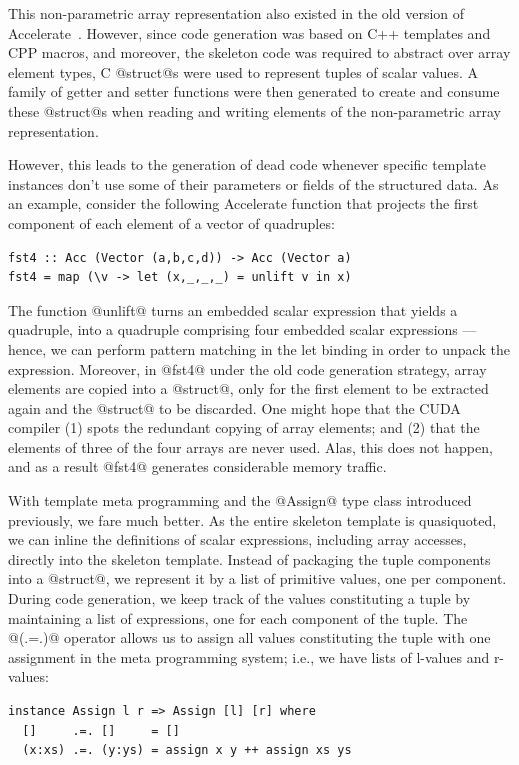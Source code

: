 This non-parametric array representation 
also existed in the old version of Accelerate~\cite{Chakravarty:2011fr}.
However, since code generation was based on C++ templates and CPP macros, and
moreover, the skeleton code was required to abstract over array element types, C
@struct@s were used to represent tuples of scalar values. A family of getter and
setter functions were then generated to create and consume these @struct@s when
reading and writing elements of the non-parametric array representation.

However, this leads to the generation of dead code whenever specific template
instances don't use some of their parameters or fields of the structured data.
As an example, consider the following Accelerate function that projects the
first component of each element of a vector of quadruples:
%
\begin{lstlisting}[style=haskell]
fst4 :: Acc (Vector (a,b,c,d)) -> Acc (Vector a)
fst4 = map (\v -> let (x,_,_,_) = unlift v in x)
\end{lstlisting}
%
The function @unlift@ turns an embedded scalar expression that yields a
quadruple, into a quadruple comprising four embedded scalar expressions ---
hence, we can perform pattern matching in the let binding in order to unpack the
expression. Moreover, in @fst4@ under the old code generation strategy,
array elements are copied into a @struct@, only for the first element to be
extracted again and the @struct@ to be discarded. One might hope that the
CUDA compiler (1) spots the redundant copying of array elements; and (2) that
the elements of three of the four arrays are never used. Alas, this does not
happen, and as a result @fst4@ generates considerable memory traffic.

With template meta programming and the @Assign@ type class introduced
previously, we fare much better. As the entire skeleton template is
quasiquoted\qq{}, we can inline the definitions of scalar expressions, including
array accesses, directly into the skeleton template. Instead of packaging the
tuple components into a @struct@, we represent it by a list of primitive values,
one per component. During code generation, we keep track of the values
constituting a tuple by maintaining a list of expressions, one for each
component of the tuple. The @(.=.)@ operator allows us to assign all values
constituting the tuple with one assignment in the meta programming system; i.e.,
we have lists of l-values and r-values:
%
\begin{lstlisting}[style=haskell]
instance Assign l r => Assign [l] [r] where
  []     .=. []     = []
  (x:xs) .=. (y:ys) = assign x y ++ assign xs ys
\end{lstlisting}

